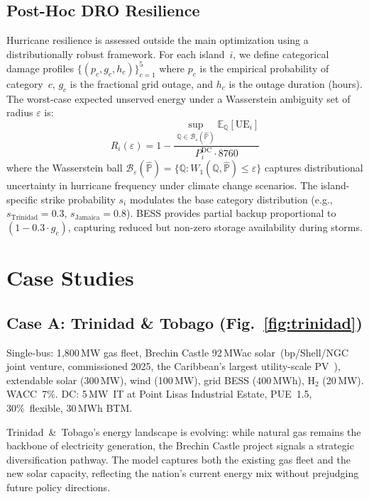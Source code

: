 \documentclass[conference,10pt]{IEEEtran}
\begin{document}
\subsection{Post-Hoc DRO Resilience}

Hurricane resilience is assessed outside the main optimization using a distributionally robust framework. For each island~$i$, we define categorical damage profiles $\{(p_c, g_c, h_c)\}_{c=1}^{5}$ where $p_c$ is the empirical probability of category~$c$, $g_c$ is the fractional grid outage, and $h_c$ is the outage duration (hours). The worst-case expected unserved energy under a Wasserstein ambiguity set of radius $\varepsilon$ is:
\begin{equation}
R_i(\varepsilon) = 1 - \frac{\sup_{\mathbb{Q} \in \mathcal{B}_\varepsilon(\hat{\mathbb{P}})} \mathbb{E}_\mathbb{Q}[\text{UE}_i]}{P_i^{\text{DC}} \cdot 8760}
\label{eq:dro}
\end{equation}
where the Wasserstein ball $\mathcal{B}_\varepsilon(\hat{\mathbb{P}}) = \{\mathbb{Q} : W_1(\mathbb{Q}, \hat{\mathbb{P}}) \leq \varepsilon\}$ captures distributional uncertainty in hurricane frequency under climate change scenarios. The island-specific strike probability $s_i$ modulates the base category distribution (e.g., $s_{\text{Trinidad}} = 0.3$, $s_{\text{Jamaica}} = 0.8$). BESS provides partial backup proportional to $(1 - 0.3 \cdot g_c)$, capturing reduced but non-zero storage availability during storms.

\section{Case Studies}

\subsection{Case A: Trinidad \& Tobago (Fig.~\ref{fig:trinidad})}

Single-bus: 1{,}800\,MW gas fleet, Brechin Castle 92\,MWac solar~(bp/Shell/NGC joint venture, commissioned 2025, the Caribbean's largest utility-scale PV~\cite{brechin2025}), extendable solar (300\,MW), wind (100\,MW), grid BESS (400\,MWh), H$_2$ (20\,MW). WACC~7\%. DC: 5\,MW~IT at Point Lisas Industrial Estate, PUE~1.5, 30\%~flexible, 30\,MWh BTM.

Trinidad~\&~Tobago's energy landscape is evolving: while natural gas remains the backbone of electricity generation, the Brechin Castle project signals a strategic diversification pathway. The model captures both the existing gas fleet and the new solar capacity, reflecting the nation's current energy mix without prejudging future policy directions.
\end{document}
